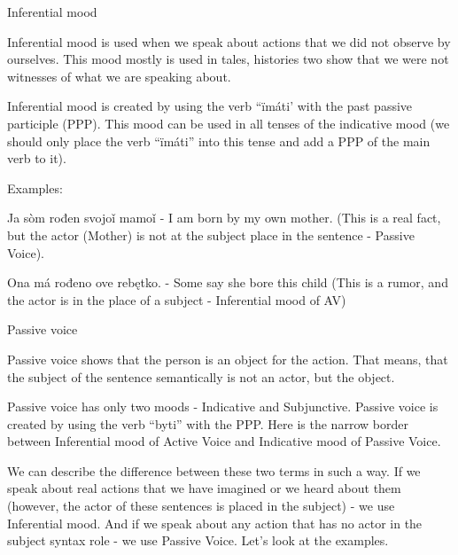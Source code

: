 Inferential mood

Inferential mood is used when we speak about actions that we did not observe by ourselves. This mood mostly is used in tales, histories two show that we were not witnesses of what we are speaking about.

Inferential mood is created by using the verb “ïmáti’ with the past passive participle (PPP). This mood can be used in all tenses of the indicative mood (we should only place the verb “ïmáti” into this tense and add a PPP of the main verb to it). 

Examples:

Ja sòm rođen svojoǐ mamoǐ - I am born by my own mother. (This is a real fact, but the actor (Mother) is not at the subject place in the sentence - Passive Voice).

Ona má rođeno ove rebętko. - Some say she bore this child (This is a rumor, and the actor is in the place of a subject - Inferential mood of AV)

Passive voice

Passive voice shows that the person is an object for the action. That means, that the subject of the sentence semantically is not an actor, but the object. 

Passive voice has only two moods - Indicative and Subjunctive. Passive voice is created by using the verb “byti” with the PPP. Here is the narrow border between Inferential mood of Active Voice and Indicative mood of Passive Voice.

We can describe the difference between these two terms in such a way. If we speak about real actions that we have imagined or we heard about them (however, the actor of these sentences is placed in the subject) - we use Inferential mood. And if we speak about any action that has no actor in the subject syntax role - we use Passive Voice. Let’s look at the examples.





